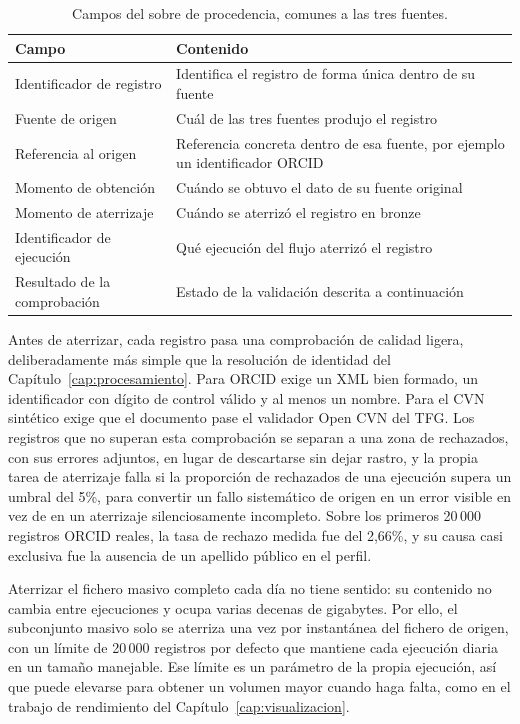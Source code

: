 \begin{table}[H]
  \centering
  \small
  \renewcommand{\arraystretch}{1.2}
  \begin{tabular}{
    p{}
    >{\raggedright\arraybackslash}p{}}
    \hline
    \textbf{Campo} & \textbf{Contenido} \\
    \hline
    Identificador de registro & Identifica el registro de forma única dentro de su fuente \\
    Fuente de origen & Cuál de las tres fuentes produjo el registro \\
    Referencia al origen & Referencia concreta dentro de esa fuente, por ejemplo un identificador ORCID \\
    Momento de obtención & Cuándo se obtuvo el dato de su fuente original \\
    Momento de aterrizaje & Cuándo se aterrizó el registro en bronze \\
    Identificador de ejecución & Qué ejecución del flujo aterrizó el registro \\
    Resultado de la comprobación & Estado de la validación descrita a continuación \\
    \hline
  \end{tabular}
  \caption{Campos del sobre de procedencia, comunes a las tres fuentes.}
  \label{tab:tfm_sobre_procedencia}
\end{table}

Antes de aterrizar, cada registro pasa una comprobación de calidad ligera,
deliberadamente más simple que la resolución de identidad del
Capítulo~\ref{cap:procesamiento}. Para ORCID exige un XML bien formado, un
identificador con dígito de control válido y al menos un nombre. Para el
CVN sintético exige que el documento pase el validador Open CVN del TFG.
Los registros que no superan esta comprobación se separan a una zona de
rechazados, con sus errores adjuntos, en lugar de descartarse sin dejar
rastro, y la propia tarea de aterrizaje falla si la proporción de
rechazados de una ejecución supera un umbral del 5\%, para convertir un
fallo sistemático de origen en un error visible en vez de en un aterrizaje
silenciosamente incompleto. Sobre los primeros 20\,000 registros ORCID
reales, la tasa de rechazo medida fue del 2,66\%, y su causa casi
exclusiva fue la ausencia de un apellido público en el perfil.

Aterrizar el fichero masivo completo cada día no tiene sentido: su
contenido no cambia entre ejecuciones y ocupa varias decenas de gigabytes.
Por ello, el subconjunto masivo solo se aterriza una vez por instantánea
del fichero de origen, con un límite de 20\,000 registros por defecto que
mantiene cada ejecución diaria en un tamaño manejable. Ese límite es un
parámetro de la propia ejecución, así que puede elevarse para obtener un
volumen mayor cuando haga falta, como en el trabajo de rendimiento del
Capítulo~\ref{cap:visualizacion}.

